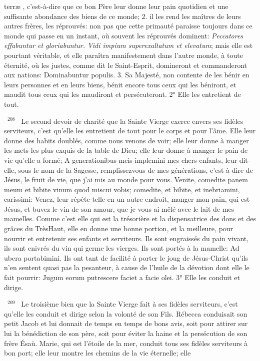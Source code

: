 \documentclass[paper=a5,pagesize=pdftex,fontsize=15pt,headinclude=on,twoside=off]{scrbook}
\newcommand{\negphantom}[1]{\settowidth{\dimen0}{#1}\hspace*{-\dimen0}}
\newcommand{\versenb}[1]{\par \vspace{10pt}~\negphantom{~${}^{#1}$~}${}^{#1}$~}
\newcommand{\latin}[1]{\emph{#1}}
\begin{document}
terræ , c'est-à-dire que ce bon Père leur donne leur pain quotidien et une suffisante abondance des biens de ce
monde; 2. il les rend les maîtres de leurs autres frères, les réprouvés: non pas que cette primauté paraisse
toujours dans ce monde qui passe en un instant, où souvent les réprouvés dominent: \latin{Peccatores effabuntur et
gloriabuntur. Vidi impium superexaltatum et elevatum}; mais elle est pourtant véritable, et elle paraîtra
manifestement dans l'autre monde, à toute éternité, où les justes, comme dit le Saint-Esprit, domineront et
commanderont aux nations: Dominabuntur populis. 3. Sa Majesté, non contente de les bénir en leurs personnes et
en leurs biens, bénit encore tous ceux qui les béniront, et maudit tous ceux qui les maudiront et persécuteront.
2° Elle les entretient de tout.
\versenb{208} Le second devoir de charité que la Sainte Vierge exerce envers ses fidèles serviteurs, c'est qu'elle les
entretient de tout pour le corps et pour l'âme. Elle leur donne des habits doublés, comme nous venons de voir; elle
leur donne à manger les mets les plus exquis de la table de Dieu; elle leur donne à manger le pain de vie qu'elle a
formé; A generationibus meis implemini mes chers enfants, leur dit-elle, sous le nom de la Sagesse, remplissezvous de mes générations, c'est-à-dire de Jésus, le fruit de vie, que j'ai mis au monde pour vous. Venite, comedite
panem meum et bibite vinum quod miscui vobis; comedite, et bibite, et inebriamini, carissimi: Venez, leur répète-telle en un autre endroit, manger mon pain, qui est Jésus, et buvez le vin de son amour, que je vous ai mêlé avec le
lait de mes mamelles. Comme c'est elle qui est la trésorière et la dispensatrice des dons et des grâces du TrèsHaut, elle en donne une bonne portion, et la meilleure, pour nourrir et entretenir ses enfants et serviteurs. Ils sont
engraissés du pain vivant, ils sont enivrés du vin qui germe les vierges. Ils sont portés à la mamelle: Ad ubera
portabimini. Ils ont tant de facilité à porter le joug de Jésus-Christ qu'ils n'en sentent quasi pas la pesanteur, à
cause de l'huile de la dévotion dont elle le fait pourrir: Jugum eorum putrescere faciet a facie olei.
3° Elle les conduit et dirige.
\versenb{209} Le troisième bien que la Sainte Vierge fait à ses fidèles serviteurs, c'est qu'elle les conduit et dirige selon la
volonté de son Fils. Rébecca conduisait son petit Jacob et lui donnait de temps en temps de bons avis, soit pour
attirer sur lui la bénédiction de son père, soit pour éviter la haine et la persécution de son frère Ésaü. Marie, qui est
l'étoile de la mer, conduit tous ses fidèles serviteurs à bon port; elle leur montre les chemins de la vie éternelle; elle
\end{document}

